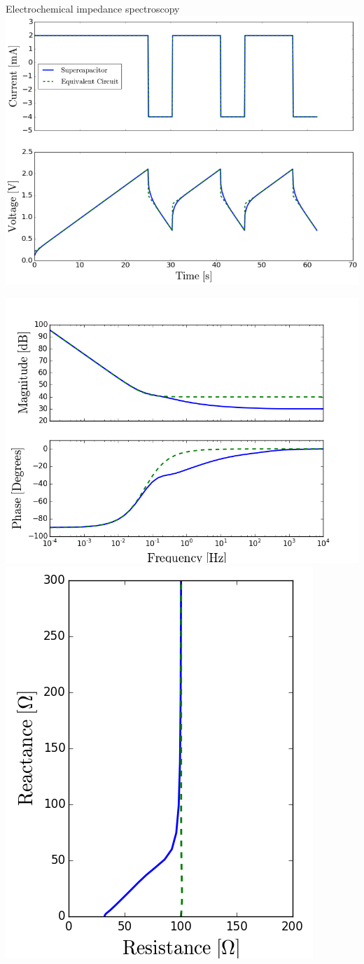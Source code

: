 \begin{frame}{Electrochemical impedance spectroscopy}
\includegraphics[width=0.6\linewidth]{rawfigs/supercapacitor/comparison_supercapacitor_vs_equivalent_circuit}

\includegraphics[width=0.6\linewidth]{rawfigs/supercapacitor/bode_plot_no_faradaic_processes}
\includegraphics[width=0.35\linewidth]{rawfigs/supercapacitor/nyquist_plot_no_faradaic_processes}
\end{frame}
